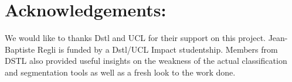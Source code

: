 \documentclass[a4paper,11pt]{report}
\begin{document}
\chapter{Acknowledgements:}
	We would like to thanks Dstl and UCL for their support on this project. Jean-Baptiste Regli is funded by a Dstl/UCL Impact studentship. Members from DSTL also provided useful insights on the weakness of the actual classification and segmentation tools as well as a fresh look to the work done.\\

	
\renewcommand\bibname{Bibliography:}

\nocite{*}

\end{document}
